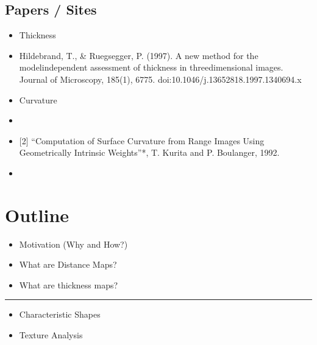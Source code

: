 \documentclass[letterpaper,10pt,english]{sphinxmanual}
\begin{document}
\subsection{Papers / Sites}
\label{\detokenize{06-AdvancedShapeAndTexture:papers-sites}}\begin{itemize}
\item {} 
\sphinxAtStartPar
Thickness

\item {} 
\sphinxAtStartPar
{} Hildebrand, T., \& Ruegsegger, P. (1997). A new method for the model\sphinxhyphen{}independent assessment of thickness in three\sphinxhyphen{}dimensional images. Journal of Microscopy, 185(1), 67\textendash{}75. doi:10.1046/j.1365\sphinxhyphen{}2818.1997.1340694.x

\item {} 
\sphinxAtStartPar
Curvature

\item {} 
\sphinxAtStartPar
{}

\item {} 
\sphinxAtStartPar
{[}2{]} “Computation of Surface Curvature from Range Images Using Geometrically Intrinsic Weights”*, T. Kurita and P. Boulanger, 1992.

\item {} 
\sphinxAtStartPar
{}

\end{itemize}


\section{Outline}
\label{\detokenize{06-AdvancedShapeAndTexture:outline}}\begin{itemize}
\item {} 
\sphinxAtStartPar
Motivation (Why and How?)

\item {} 
\sphinxAtStartPar
What are Distance Maps?

\item {} 
\sphinxAtStartPar
What are thickness maps?

\end{itemize}


\bigskip\hrule\bigskip

\begin{itemize}
\item {} 
\sphinxAtStartPar
Characteristic Shapes

\item {} 
\sphinxAtStartPar
Texture Analysis

\end{itemize}
\end{document}
